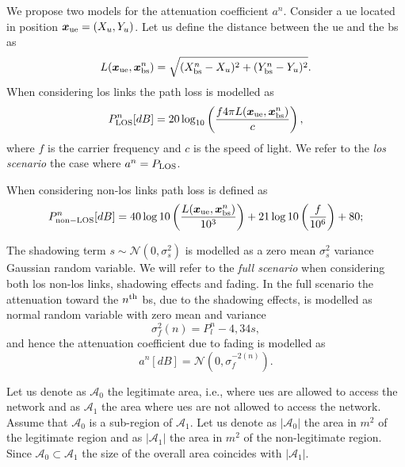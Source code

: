 \documentclass[draftcls,onecolumn,12pt]{IEEEtran}
\begin{document}
We propose two models for the attenuation coefficient $a^n$. Consider a \ac{ue} located in position $\bm{x}_{\rm ue}=(X_u,Y_u)$. Let us define the distance between the \ac{ue} and the \ac{bs} as
\begin{equation}
    L(\bm{x}_{\rm ue},\bm{x}_{\rm bs}^n) = \sqrt{(X_{\rm bs}^n-X_u)^2+(Y_{\rm bs}^n-Y_u)^2}.
\end{equation}
When considering \ac{los} links the path loss is modelled as
\begin{equation}\label{eq:los}
    P_{\rm LOS}^n[dB] = 20\log_{10}\left(\frac{f 4\pi L(\bm{x}_{\rm ue},\bm{x}_{\rm bs}^n)}{c}\right),
\end{equation}
where $f$ is the carrier frequency and $c$ is the speed of light.
We refer to the \textit{\ac{los} scenario} the case where $a^n=P_{\rm LOS}$.

When considering non-\ac{los} links path loss is defined as
\begin{equation}
    P_{\rm non-LOS}^n[dB] = 40\log10\left (\frac{L(\bm{x}_{\rm ue},\bm{x}_{\rm bs}^n)}{10^3}\right ) + 21\log10\left(\frac{f}{10^6}\right) + 80;
\end{equation}

The shadowing term $s \sim \mathcal{N}(0,\sigma_s^2)$ is modelled as a zero mean $\sigma_s^2$ variance Gaussian random variable. We will refer to the \textit{full scenario} when considering both \ac{los} non-\ac{los} links, shadowing effects and fading. In the full scenario the attenuation toward the $n^{\rm th}$ \ac{bs}, due to the shadowing effects, is modelled as normal random variable with zero mean and variance
\begin{equation}\label{eq:rss}
    \sigma_f^2(n) = P_l^n-4,34s,
\end{equation}
and hence the attenuation coefficient due to fading is modelled as
\begin{equation}\label{eq:fade}
a^n[dB]= \mathcal{N}(0,\sigma_f^{-2(n)}).
\end{equation}

Let us denote as $\mathcal{A}_0$ the legitimate area, i.e., where \acp{ue} are allowed to access the network and as $\mathcal{A}_1$ the area where \acp{ue} are not allowed to access the network. Assume that $\mathcal{A}_0$ is a sub-region of $\mathcal{A}_1$. Let us denote as $|\mathcal{A}_{0}|$ the area in $m^2$ of the legitimate region and as $|\mathcal{A}_{1}|$ the area in $m^2$ of the non-legitimate region.
Since $\mathcal{A}_0 \subset \mathcal{A}_1$ the size of the overall area coincides with $|\mathcal{A}_1|$. 
\end{document}
